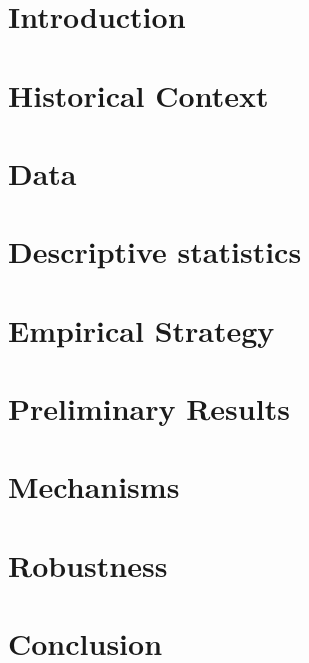 \newpage

\setcounter{page}{1}
\section{Introduction}\label{sec:introduction}


\section{Historical Context}\label{sec:context}


\section{Data}\label{sec:data}


\section{Descriptive statistics}\label{sec:descriptives}


\section{Empirical Strategy}\label{sec:empirical_strategy}


\section{Preliminary Results}\label{sec:results}


\clearpage
\section{Mechanisms}\label{sec:mechanisms}


\section{Robustness}\label{sec:robustness}


\newpage
\section{Conclusion}\label{sec:conclusion}







